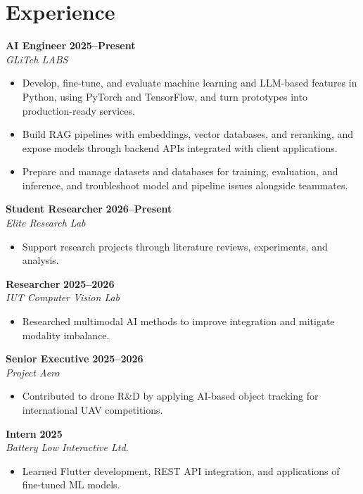 \documentclass{resume}
\renewenvironment{rSection}[1]{
  \Needspace{3\baselineskip}%
  \section{#1}
  \begin{list}{}{
      \setlength{\leftmargin}{0.2em}
  }
  \item[]
}{
  \end{list}
  \vspace{0pt}
}
\begin{document}
\begin{rSection}{Experience}

\textbf{AI Engineer} \hfill \textbf{2025--Present} \\
\emph{GLiTch LABS}
\begin{itemize}
  \item Develop, fine-tune, and evaluate machine learning and LLM-based features in Python, using PyTorch and TensorFlow, and turn prototypes into production-ready services.
  \item Build RAG pipelines with embeddings, vector databases, and reranking, and expose models through backend APIs integrated with client applications.
  \item Prepare and manage datasets and databases for training, evaluation, and inference, and troubleshoot model and pipeline issues alongside teammates.
\end{itemize}

\textbf{Student Researcher} \hfill \textbf{2026--Present} \\
\emph{Elite Research Lab}
\begin{itemize}
  \item Support research projects through literature reviews, experiments, and analysis.
\end{itemize}

\textbf{Researcher} \hfill \textbf{2025--2026} \\
\emph{IUT Computer Vision Lab}
\begin{itemize}
  \item Researched multimodal AI methods to improve integration and mitigate modality imbalance.
\end{itemize}

\textbf{Senior Executive} \hfill \textbf{2025--2026} \\
\emph{Project Aero}
\begin{itemize}
  \item Contributed to drone R\&D by applying AI-based object tracking for international UAV competitions.
\end{itemize}

\textbf{Intern} \hfill \textbf{2025} \\
\emph{Battery Low Interactive Ltd.}
\begin{itemize}
  \item Learned Flutter development, REST API integration, and applications of fine-tuned ML models.
\end{itemize}

\end{rSection}
\end{document}
